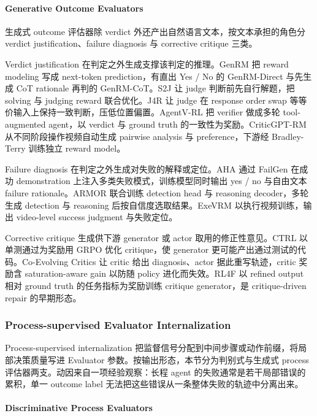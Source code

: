 \paragraph{Generative Outcome Evaluators}

生成式 outcome 评估器除 verdict 外还产出自然语言文本，按文本承担的角色分 verdict justification、failure diagnosis 与 corrective critique 三类。

Verdict justification 在判定之外生成支撑该判定的推理。GenRM \cite{Zha24o} 把 reward modeling 写成 next-token prediction，有直出 Yes / No 的 GenRM-Direct 与先生成 CoT rationale 再判的 GenRM-CoT。S2J \cite{Sun25l} 让 judge 判断前先自行解题，把 solving 与 judging reward 联合优化。J4R \cite{Xu25i} 让 judge 在 response order swap 等等价输入上保持一致判断，压低位置偏置。AgentV-RL \cite{Zha26ac} 把 verifier 做成多轮 tool-augmented agent，以 verdict 与 ground truth 的一致性为奖励。CriticGPT-RM \cite{Liu24g} 从不同阶段操作视频自动生成 pairwise analysis 与 preference，下游经 Bradley-Terry 训练独立 reward model。

Failure diagnosis 在判定之外生成对失败的解释或定位。AHA \cite{Dua24} 通过 FailGen 在成功 demonstration 上注入多类失败模式，训练模型同时输出 yes / no 与自由文本 failure rationale。ARMOR \cite{Qi26} 联合训练 detection head 与 reasoning decoder，多轮生成 detection 与 reasoning 后按自信度选取结果。ExeVRM \cite{Son26d} 以执行视频训练，输出 video-level success judgment 与失败定位。

Corrective critique 生成供下游 generator 或 actor 取用的修正性意见。CTRL \cite{Xie25c} 以单测通过为奖励用 GRPO 优化 critique，使 generator 更可能产出通过测试的代码。Co-Evolving Critics \cite{Li26l} 让 critic 给出 diagnosis、actor 据此重写轨迹，critic 奖励含 saturation-aware gain 以防随 policy 进化而失效。RL4F \cite{Aky23} 以 refined output 相对 ground truth 的任务指标为奖励训练 critique generator，是 critique-driven repair 的早期形态。

\subsubsection{Process-supervised Evaluator Internalization}

Process-supervised internalization 把监督信号分配到中间步骤或动作前缀，将局部决策质量写进 Evaluator 参数。按输出形态，本节分为判别式与生成式 process 评估器两支。动因来自一项经验观察：长程 agent 的失败通常是若干局部错误的累积，单一 outcome label 无法把这些错误从一条整体失败的轨迹中分离出来。

\paragraph{Discriminative Process Evaluators}

